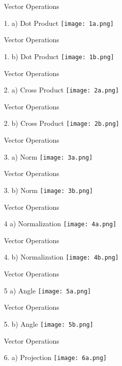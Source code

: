 \documentclass[10pt]{beamer}
\begin{document}
\begin{frame}{Vector Operations}
\begin{block}{1. a) Dot Product}
\center
\texttt{[image: 1a.png]}
\end{block}
\end{frame}
\begin{frame}{Vector Operations}
\begin{block}{1. b) Dot Product}
\center
\texttt{[image: 1b.png]}
\end{block}
\end{frame}
\begin{frame}{Vector Operations}
\begin{block}{2. a) Cross Product}
\center
\texttt{[image: 2a.png]}
\end{block}
\end{frame}
\begin{frame}{Vector Operations}
\begin{block}{2. b) Cross Product}
\center
\texttt{[image: 2b.png]}
\end{block}
\end{frame}
\begin{frame}{Vector Operations}
\begin{block}{3. a) Norm}
\center
\texttt{[image: 3a.png]}
\end{block}
\end{frame}
\begin{frame}{Vector Operations}
\begin{block}{3. b) Norm}
\center
\texttt{[image: 3b.png]}
\end{block}
\end{frame}
\begin{frame}{Vector Operations}
\begin{block}{4 a) Normalization}
\center
\texttt{[image: 4a.png]}
\end{block}
\end{frame}
\begin{frame}{Vector Operations}
\begin{block}{4. b) Normalization}
\center
\texttt{[image: 4b.png]}
\end{block}
\end{frame}
\begin{frame}{Vector Operations}
\begin{block}{5 a) Angle}
\center
\texttt{[image: 5a.png]}
\end{block}
\end{frame}
\begin{frame}{Vector Operations}
\begin{block}{5. b) Angle}
\center
\texttt{[image: 5b.png]}
\end{block}
\end{frame}
\begin{frame}{Vector Operations}
\begin{block}{6. a) Projection}
\center
\texttt{[image: 6a.png]}
\end{block}
\end{frame}
\end{document}

